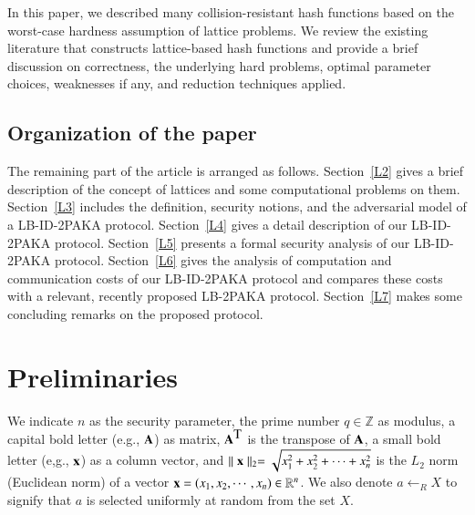 \documentclass[10pt]{elsarticle}
\begin{document}
In this paper, we described many collision-resistant hash functions
based on the worst-case hardness assumption of lattice problems. We
review the existing literature that constructs lattice-based hash
functions and provide a brief discussion on correctness, the
underlying hard problems, optimal parameter choices, weaknesses if
any, and reduction techniques applied.

\subsection{Organization of the paper}
The remaining part of the article is arranged as follows.
Section~\ref{L2} gives a brief description of the concept of
lattices and some computational problems on them. Section~\ref{L3}
includes the definition, security notions, and the adversarial model
of a LB-ID-2PAKA protocol. Section~\ref{L4} gives a detail
description of our LB-ID-2PAKA protocol. Section~\ref{L5} presents a
formal security analysis of our LB-ID-2PAKA protocol.
Section~\ref{L6} gives the analysis of computation and communication
costs of our LB-ID-2PAKA protocol and compares these costs with a
relevant, recently proposed LB-2PAKA protocol. Section~\ref{L7}
makes some concluding remarks on the proposed protocol.

\section{Preliminaries}
We indicate $n$ as the security parameter, the prime number $q\in
\mathbb{Z}$ as modulus, a capital bold letter (e.g.,
$\mbox{\textbf{A}}$) as matrix, $\mbox{\textbf{A}}^{\mbox{T}}$ is
the transpose of $\mbox{\textbf{A}}$, a small bold letter (e,g.,
$\mbox{\textbf{x}}$) as a column vector, and
$\parallel\mbox{\textbf{x}}\parallel_{2} = \sqrt{x^{2}_{1} +
x^{2}_{2} + \cdots + x^{2}_{n}}$ is the $L_{2}$ norm (Euclidean
norm) of a vector $\mbox{\textbf{x}} = (x_{1}, x_{2}, \cdots,
x_{n})\in\mathbb{R}^{n}$. We also denote $a\leftarrow_{R}X$ to
signify that $a$ is selected uniformly at random from the set $X$.
\end{document}
